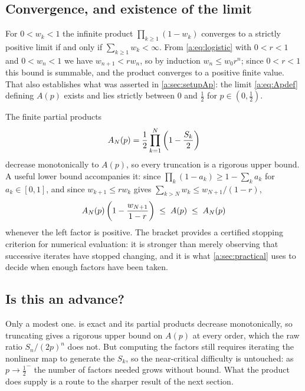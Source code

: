 \subsection{Convergence, and existence of the limit}
\label{a:sec:prodconvergence}

For $0<w_k<1$ the infinite product $\prod_{k\ge1}(1-w_k)$ converges to a strictly
positive limit if and only if $\sum_{k\ge1}w_k<\infty$. From \cref{a:eq:logistic}
with $0<r<1$ and $0<w_n<1$ we have $w_{n+1}<rw_n$, so by induction
$w_n\le w_0r^n$; since $0<r<1$ this bound is summable, and the product converges
to a positive finite value. That also establishes what was asserted in
\cref{a:sec:setupAp}: the limit \cref{a:eq:Apdef} defining $A(p)$ exists and lies
strictly between $0$ and $\tfrac12$ for $p\in(0,\tfrac12)$.

The finite partial products
\begin{equation}
\label{a:eq:partialproduct}
A_N(p) = \frac12\prod_{k=1}^{N}\left(1-\frac{S_k}{2}\right)
\end{equation}
decrease monotonically to $A(p)$, so every truncation is a rigorous upper bound. A
useful lower bound accompanies it: since $\prod_k(1-a_k)\ge1-\sum_ka_k$ for
$a_k\in[0,1]$, and since $w_{k+1}\le rw_k$ gives
$\sum_{k>N}w_k\le w_{N+1}/(1-r)$,
\begin{equation}
\label{a:eq:tailbound}
A_N(p)\left(1-\frac{w_{N+1}}{1-r}\right) \;\le\; A(p) \;\le\; A_N(p)
\end{equation}
whenever the left factor is positive. The bracket provides a certified stopping
criterion for numerical evaluation: it is stronger than merely observing that
successive iterates have stopped changing, and it is what \cref{a:sec:practical}
uses to decide when enough factors have been taken.

\subsection{Is this an advance?}
\label{a:sec:advance}

Only a modest one.  is exact and its partial products
decrease monotonically, so truncating gives a rigorous upper bound on $A(p)$ at
every order, which the raw ratio $S_n/(2p)^n$ does not. But computing the factors
still requires iterating the nonlinear map to generate the $S_k$, so the
near-critical difficulty is untouched: as $p\to\tfrac12^-$ the number of factors
needed grows without bound. What the product does supply is a route to the sharper
result of the next section.
